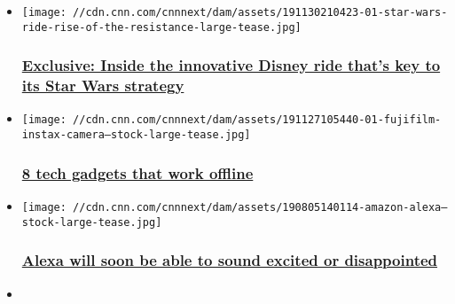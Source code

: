 \begin{itemize}
\item
  \href{/2019/12/03/tech/star-wars-rise-of-the-resistance-ride/index.html}{}

  \texttt{[image: //cdn.cnn.com/cnnnext/dam/assets/191130210423-01-star-wars-ride-rise-of-the-resistance-large-tease.jpg]}

  \hypertarget{exclusive-inside-the-innovative-disney-ride-thats-key-to-its-star-wars-strategy}{%
  \subsubsection{\texorpdfstring{\href{/2019/12/03/tech/star-wars-rise-of-the-resistance-ride/index.html}{Exclusive:
  Inside the innovative Disney ride that's key to its Star Wars
  strategy}}{Exclusive: Inside the innovative Disney ride that's key to its Star Wars strategy}}\label{exclusive-inside-the-innovative-disney-ride-thats-key-to-its-star-wars-strategy}}
\item
  \href{/2019/11/30/tech/best-offline-tech-gadgets/index.html}{}

  \texttt{[image: //cdn.cnn.com/cnnnext/dam/assets/191127105440-01-fujifilm-instax-camera---stock-large-tease.jpg]}

  \hypertarget{8-tech-gadgets-that-work-offline}{%
  \subsubsection{\texorpdfstring{\href{/2019/11/30/tech/best-offline-tech-gadgets/index.html}{8
  tech gadgets that work
  offline}}{8 tech gadgets that work offline}}\label{8-tech-gadgets-that-work-offline}}
\item
  \href{/2019/11/27/business/alexa-voice-happy-excited-trnd/index.html}{}

  \texttt{[image: //cdn.cnn.com/cnnnext/dam/assets/190805140114-amazon-alexa---stock-large-tease.jpg]}

  \hypertarget{alexa-will-soon-be-able-to-sound-excited-or-disappointed}{%
  \subsubsection{\texorpdfstring{\href{/2019/11/27/business/alexa-voice-happy-excited-trnd/index.html}{Alexa
  will soon be able to sound excited or
  disappointed}}{Alexa will soon be able to sound excited or disappointed}}\label{alexa-will-soon-be-able-to-sound-excited-or-disappointed}}
\item
  \href{/2019/11/27/tech/marie-kondo-store-review/index.html}{}


\end{itemize}
